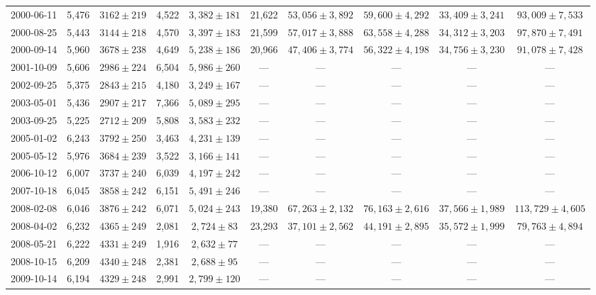 \begin{landscape}
\begin{longtable}{cccccccccc}
{2000-06-11} & 5,476 & {$3162  \pm  219$} & 4,522 & {$3,382 \pm 181$} & 21,622 & {$53,056 \pm 3,892$} & {$59,600 \pm 4,292$} & {$33,409 \pm 3,241$} & {$93,009 \pm 7,533$} \\
{2000-08-25} & 5,443 & {$3144  \pm  218$} & 4,570 & {$3,397 \pm 183$} & 21,599 & {$57,017 \pm 3,888$} & {$63,558 \pm 4,288$} & {$34,312 \pm 3,203$} & {$97,870 \pm 7,491$} \\
{2000-09-14} & 5,960 & {$3678  \pm  238$} & 4,649 & {$5,238 \pm 186$} & 20,966 & {$47,406 \pm 3,774$} & {$56,322 \pm 4,198$} & {$34,756 \pm 3,230$} & {$91,078 \pm 7,428$} \\
{2001-10-09} & 5,606 & {$2986  \pm  224$} & 6,504 & {$5,986 \pm 260$} & --- & --- & --- & --- & --- \\
{2002-09-25} & 5,375 & {$2843  \pm  215$} & 4,180 & {$3,249 \pm 167$} & --- & --- & --- & --- & --- \\
{2003-05-01} & 5,436 & {$2907  \pm  217$} & 7,366 & {$5,089 \pm 295$} & --- & --- & --- & --- & --- \\
{2003-09-25} & 5,225 & {$2712  \pm  209$} & 5,808 & {$3,583 \pm 232$} & --- & --- & --- & --- & --- \\
{2005-01-02} & 6,243 & {$3792  \pm  250$} & 3,463 & {$4,231 \pm 139$} & --- & --- & --- & --- & --- \\
{2005-05-12} & 5,976 & {$3684  \pm  239$} & 3,522 & {$3,166 \pm 141$} & --- & --- & --- & --- & --- \\
{2006-10-12} & 6,007 & {$3737  \pm  240$} & 6,039 & {$4,197 \pm 242$} & --- & --- & --- & --- & --- \\
{2007-10-18} & 6,045 & {$3858  \pm  242$} & 6,151 & {$5,491 \pm 246$} & --- & --- & --- & --- & --- \\
{2008-02-08} & 6,046 & {$3876  \pm  242$} & 6,071 & {$5,024 \pm 243$} & 19,380 & {$67,263 \pm 2,132$} & {$76,163 \pm 2,616$} & {$37,566 \pm 1,989$} & {$113,729 \pm 4,605$} \\
{2008-04-02} & 6,232 & {$4365  \pm  249$} & 2,081 & {$2,724 \pm 83$} & 23,293 & {$37,101 \pm 2,562$} & {$44,191 \pm 2,895$} & {$35,572 \pm 1,999$} & {$79,763 \pm 4,894$} \\
{2008-05-21} & 6,222 & {$4331  \pm  249$} & 1,916 & {$2,632 \pm 77$} & --- & --- & --- & --- & --- \\
{2008-10-15} & 6,209 & {$4340  \pm  248$} & 2,381 & {$2,688 \pm 95$} & --- & --- & --- & --- & --- \\
{2009-10-14} & 6,194 & {$4329  \pm  248$} & 2,991 & {$2,799 \pm 120$} & --- & --- & --- & --- & --- \\

\end{longtable}
\end{landscape}
